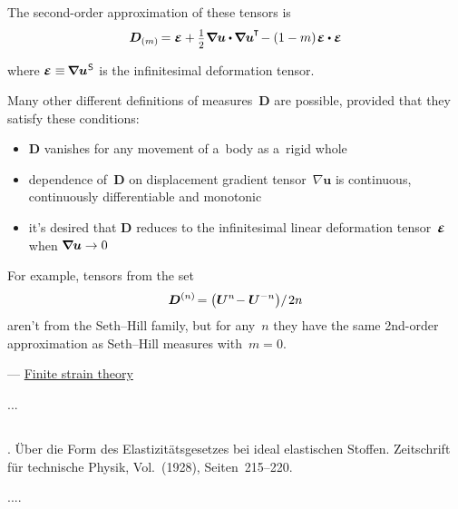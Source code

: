 The second\hbox{-}order approximation of these tensors is
\[ \bm{D}_{(m)} \hspace{-0.2ex} =
\infinitesimaldeformation
+ \smalldisplaystyleonehalf \hspace{.1ex} \boldnabla\bm{u} \dotp \hspace{-0.1ex} \boldnabla\bm{u}^{\hspace{-0.1ex}\T} \hspace{-0.3ex}
- (1 - m) \hspace{.2ex} \infinitesimaldeformation \dotp \infinitesimaldeformation \]

\vspace{-0.25em}\noindent
where ${\infinitesimaldeformation \equiv \hspace{-0.2ex} \boldnabla {\bm{u}}^{\hspace{.1ex}\mathsf{S}}}$ is the infinitesimal deformation tensor.

Many other different definitions of measures~$\bm{D}$ are possible, provided that they satisfy these conditions:

\begin{itemize}
\item $\bm{D}$ vanishes for any movement of a~body as a~rigid whole
\item dependence of~$\bm{D}$ on displacement gradient tensor~${\nabla \bm{u}}$ is continuous, continuously differentiable and monotonic
\item it’s desired that $\bm{D}$ reduces to the infinitesimal linear deformation tensor~${\infinitesimaldeformation}$ when ${\bm{\nabla}\hspace{-0.2ex} \bm{u} \to 0}$
\end{itemize}

\noindent For example, tensors from the set
\[ \displaystyle \bm{D}^{(n)} \hspace{-0.32ex} = \left( {\bm{U}}^{n} \hspace{-0.4ex} - {\bm{U}}^{-n} \right) \hspace{-0.4ex} / \hspace{.25ex} 2n \]
aren’t from the Seth\hbox{--}Hill family, but for any~$n$ they have the same 2nd\hbox{-}order approximation as Seth\hbox{--}Hill measures with~${m=0}$.

\vspace{.4em} \noindent \hfill {}\:--- \href{https://en.wikipedia.org/wiki/Finite_strain_theory}{Finite strain theory}

...


\subsection*{}

\href{https://en.wikipedia.org/wiki/Heinrich_Hencky}{%
%
}.
Über die Form des Elastizitätsgesetzes bei ideal elastischen Stoffen.
Zeitschrift für technische Physik, Vol.~(1928),
Seiten~215\hbox{--}220.

....

